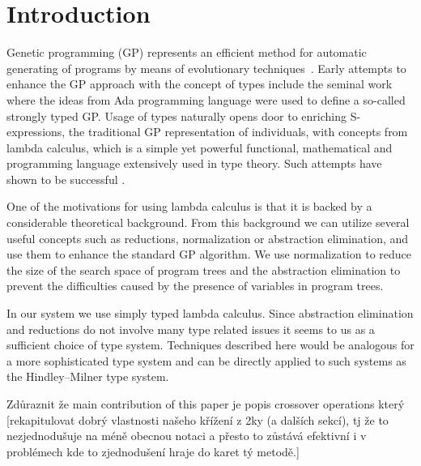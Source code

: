 \documentclass{sig-alternate}
\newcommand{\red}[1]{{\color{red} #1}}
\begin{document}


\section{Introduction}


Genetic programming (GP) represents an efficient method for automatic generating of programs by means of evolutionary techniques~\cite{koza92,koza03}. Early attempts to enhance the GP approach with the concept of types include the seminal work~\cite{montana95} where the ideas from Ada programming language were used to define a so-called strongly typed GP.   
Usage of types naturally opens door to enriching S-expressions,
the traditional GP representation of individuals, with concepts from
lambda calculus, which is a simple yet powerful functional, mathematical and programming language extensively used in type theory. Such attempts have shown to be successful \cite{yu01}. 

One of the motivations for using lambda calculus is that it is backed by a considerable theoretical background. From this background we can utilize several useful concepts such as reductions, normalization or abstraction elimination, and use them to enhance the standard GP algorithm. We use normalization to reduce the size of the search space of program trees and the abstraction elimination to prevent
the difficulties caused by the presence of variables in program trees.

In our system we use simply typed lambda calculus. Since abstraction elimination and reductions do not involve many type related issues it seems to us as a sufficient choice of type system. Techniques described here would be analogous for a more sophisticated type system and can be directly applied to such systems as the Hindley–Milner type system.


\red{Zdůraznit že main contribution of this paper je popis crossover operations který [rekapitulovat dobrý vlastnosti našeho křížení z 2ky (a dalších sekcí), tj že to nezjednodušuje na méně obecnou notaci a přesto to zůstává efektivní i v problémech kde to zjednodušení hraje do karet tý metodě.]}

\end{document}
